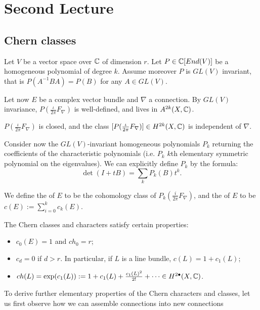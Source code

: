 \section{Second Lecture}
\subsection{Chern classes}
Let $V$ be a vector space over $\mathbb C$ of dimension $r$. Let $P\in \mathbb C[End(V)]$ be a homogeneous polynomial of degree $k$. Assume moreover $P$ is $GL(V)$ invariant, that is $P(A^{-1}BA)=P(B)$ for any $A\in GL(V)$.

Let now $E$ be a complex vector bundle and $\nabla$ a connection. By $GL(V)$ invariance, $P(\frac{\iota}{2\pi}F_\nabla)$ is well-defined, and lives in $A^{2k}(X,\mathbb C)$.
\begin{fact}
	$P(\frac{\iota}{2\pi}F_\nabla)$ is closed, and the class $[P(\frac{\iota}{2\pi}F_\nabla)]\in H^{2k}(X,\mathbb C)$ is independent of $\nabla$.
\end{fact}
Consider now the $GL(V)$-invariant homogeneous polynomials $P_k$ returning the coefficients of the characteristic polynomials (i.e. $P_k$ $k$th elementary symmetric polynomial on the eigenvalues). We can explicitly define $P_k$ by the formula:
\[
\det(I+tB)=\sum_kP_k(B)t^k.
\]

We define the  of $E$ to be the cohomology class of $P_k(\frac{i}{2\pi}F_\nabla)$, and the  of $E$ to be $c(E):=\sum_{i=0}^kc_k(E)$.

The Chern classes and characters satisfy certain properties:
\begin{itemize}
	\item $c_0(E)=1$ and $ch_0=r$;
	\item $c_d=0$ if $d>r$. In particular, if $L$ is a line bundle, $c(L)=1+c_1(L)$;
	\item $ch(L)=\exp(c_1(L)):=1+c_1(L)+\frac{c_1(L)^2}{2!}+\cdots\in H^{2\bullet}(X,\mathbb C)$.
\end{itemize}

To derive further elementary properties of the Chern characters and classes, let us first observe how we can assemble connections into new connections

